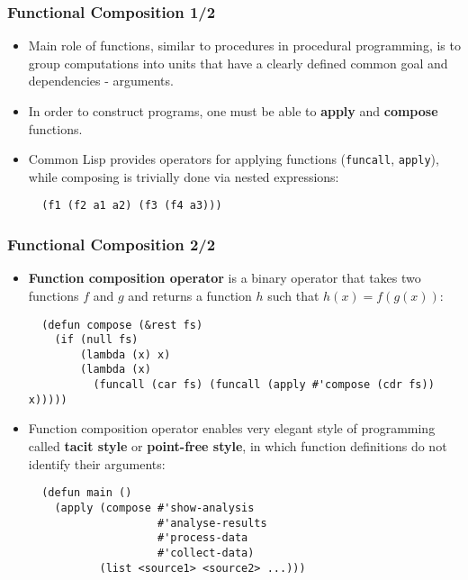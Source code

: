 \documentclass{beamer}
\begin{document}
\begin{frame}[fragile]
  \frametitle{Functional Composition 1/2}
  \begin{itemize}
  \item Main role of functions, similar to procedures in procedural programming,
    is to group computations into units that have a clearly defined common goal
    and dependencies - arguments.
  \item In order to construct programs, one must be able to \textbf{apply} and
    \textbf{compose} functions.
  \item Common Lisp provides operators for applying functions
    (\texttt{funcall}, \texttt{apply}), while composing is
    trivially done via nested expressions:
\begin{verbatim}
  (f1 (f2 a1 a2) (f3 (f4 a3)))
\end{verbatim}
  \end{itemize}
\end{frame}

\begin{frame}[fragile]
  \frametitle{Functional Composition 2/2}
  \begin{itemize}
  \item \textbf{Function composition operator} is a binary operator that takes
    two functions $f$ and $g$ and returns a function $h$ such that
    $h(x) = f(g(x))$:
\begin{verbatim}
  (defun compose (&rest fs)
    (if (null fs)
        (lambda (x) x)
        (lambda (x) 
          (funcall (car fs) (funcall (apply #'compose (cdr fs)) x)))))
\end{verbatim}
  \item Function composition operator enables very elegant style of programming
    called \textbf{tacit style} or \textbf{point-free style}, in which function
    definitions do not identify their arguments:
\begin{verbatim}
  (defun main ()
    (apply (compose #'show-analysis
                    #'analyse-results
                    #'process-data
                    #'collect-data)
           (list <source1> <source2> ...)))
\end{verbatim}
  \end{itemize}
\end{frame}
\end{document}
